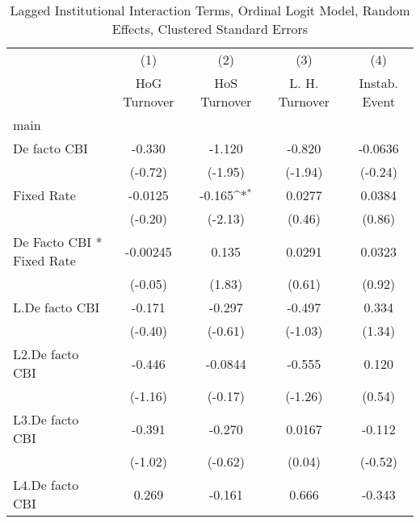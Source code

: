 {
\def\sym#1{\ifmmode^{#1}\else\(^{#1}\)\fi}
\begin{longtable}{l*{4}{c}}
\caption{Lagged Institutional Interaction Terms, Ordinal Logit Model, Random Effects, Clustered Standard Errors \label{intlagordLogLogDF}}\\
\hline\hline\endfirsthead\hline\endhead\hline\endfoot\endlastfoot
                &\multicolumn{1}{c}{(1)}&\multicolumn{1}{c}{(2)}&\multicolumn{1}{c}{(3)}&\multicolumn{1}{c}{(4)}\\
                &\multicolumn{1}{c}{HoG Turnover}&\multicolumn{1}{c}{HoS Turnover}&\multicolumn{1}{c}{L. H. Turnover}&\multicolumn{1}{c}{Instab. Event}\\
\hline
main            &                  &                  &                  &                  \\
De facto CBI    &   -0.330         &   -1.120         &   -0.820         &  -0.0636         \\
                &  (-0.72)         &  (-1.95)         &  (-1.94)         &  (-0.24)         \\
[1em]
Fixed Rate      &  -0.0125         &   -0.165\sym{*}  &   0.0277         &   0.0384         \\
                &  (-0.20)         &  (-2.13)         &   (0.46)         &   (0.86)         \\
[1em]
De Facto CBI * Fixed Rate& -0.00245         &    0.135         &   0.0291         &   0.0323         \\
                &  (-0.05)         &   (1.83)         &   (0.61)         &   (0.92)         \\
[1em]
L.De facto CBI  &   -0.171         &   -0.297         &   -0.497         &    0.334         \\
                &  (-0.40)         &  (-0.61)         &  (-1.03)         &   (1.34)         \\
[1em]
L2.De facto CBI &   -0.446         &  -0.0844         &   -0.555         &    0.120         \\
                &  (-1.16)         &  (-0.17)         &  (-1.26)         &   (0.54)         \\
[1em]
L3.De facto CBI &   -0.391         &   -0.270         &   0.0167         &   -0.112         \\
                &  (-1.02)         &  (-0.62)         &   (0.04)         &  (-0.52)         \\
[1em]
L4.De facto CBI &    0.269         &   -0.161         &    0.666         &   -0.343         \\

\end{longtable}}

